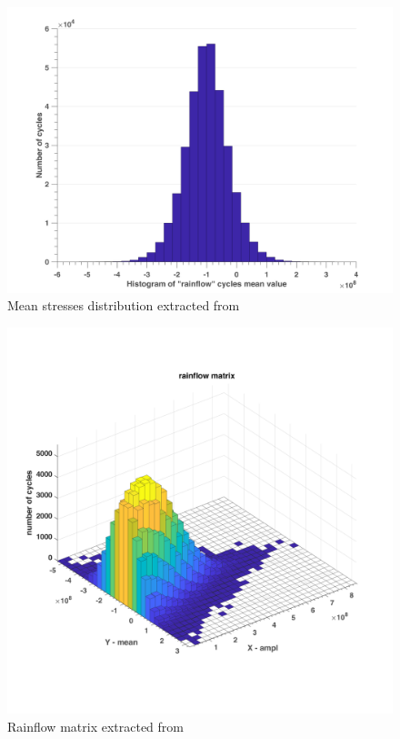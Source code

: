 \begin{figure}[!h]
	\centering
	\includegraphics[width=\textwidth]{figures//randomdemo_mean.png} 
	\caption{Mean stresses distribution extracted from }
	\label{randomdemomean}
\end{figure}
\begin{figure}[!h]
	\centering
	\includegraphics[width=\textwidth]{figures//randomdemo_3d.png} 
	\caption{Rainflow matrix extracted from }
	\label{randomdemo3d}
\end{figure}


